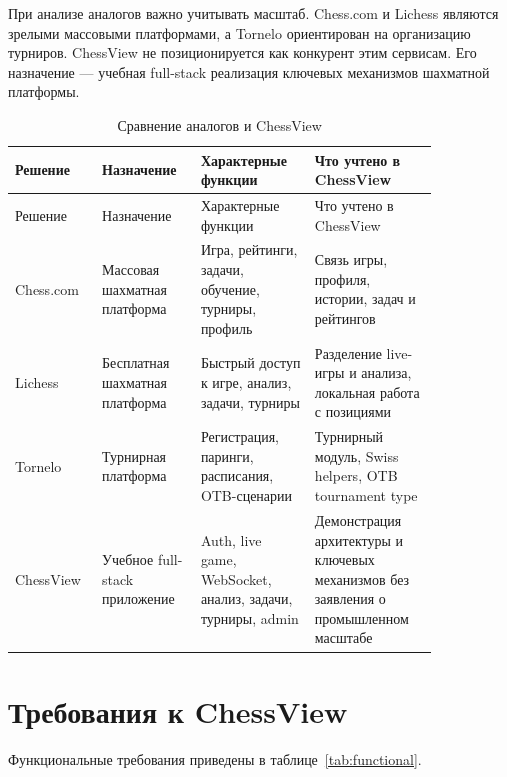 \documentclass[14pt,a4paper]{extreport}
\begin{document}
При анализе аналогов важно учитывать масштаб. Chess.com и Lichess являются зрелыми массовыми платформами, а Tornelo ориентирован на организацию турниров. ChessView не позиционируется как конкурент этим сервисам. Его назначение --- учебная full-stack реализация ключевых механизмов шахматной платформы.

\begin{center}
\scriptsize
\setlength{\tabcolsep}{3pt}
\renewcommand{\arraystretch}{1.25}
\begin{longtable}{|>{\RaggedRight\arraybackslash}p{0.14\linewidth}|>{\RaggedRight\arraybackslash}p{0.20\linewidth}|>{\RaggedRight\arraybackslash}p{0.24\linewidth}|>{\RaggedRight\arraybackslash}p{0.26\linewidth}|}
\caption{Сравнение аналогов и ChessView}\label{tab:analogues}\\
\hline
Решение & Назначение & Характерные функции & Что учтено в ChessView\\ \hline
\endfirsthead
\hline
Решение & Назначение & Характерные функции & Что учтено в ChessView\\ \hline
\endhead
Chess.com & Массовая шахматная платформа & Игра, рейтинги, задачи, обучение, турниры, профиль & Связь игры, профиля, истории, задач и рейтингов\\ \hline
Lichess & Бесплатная шахматная платформа & Быстрый доступ к игре, анализ, задачи, турниры & Разделение live-игры и анализа, локальная работа с позициями\\ \hline
Tornelo & Турнирная платформа & Регистрация, паринги, расписания, OTB-сценарии & Турнирный модуль, Swiss helpers, OTB tournament type\\ \hline
ChessView & Учебное full-stack приложение & Auth, live game, WebSocket, анализ, задачи, турниры, admin & Демонстрация архитектуры и ключевых механизмов без заявления о промышленном масштабе\\ \hline
\end{longtable}
\end{center}

\section{Требования к ChessView}

Функциональные требования приведены в таблице~\ref{tab:functional}.
\end{document}
